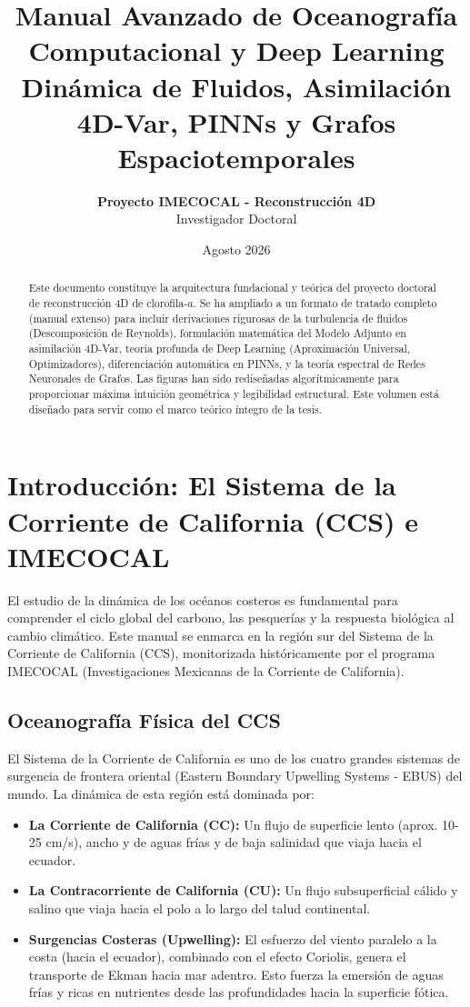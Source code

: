 \documentclass[11pt,a4paper]{article}
\title{\textbf{\Huge Manual Avanzado de Oceanografía Computacional y Deep Learning}\\ \vspace{0.8cm} \LARGE Dinámica de Fluidos, Asimilación 4D-Var, PINNs y Grafos Espaciotemporales}
\author{\textbf{Proyecto IMECOCAL - Reconstrucción 4D} \\ Investigador Doctoral}
\date{Agosto 2026}
\begin{document}
\maketitle
\thispagestyle{empty}

\vspace{2cm}
\begin{abstract}
\noindent Este documento constituye la arquitectura fundacional y teórica del proyecto doctoral de reconstrucción 4D de clorofila-$a$. Se ha ampliado a un formato de tratado completo (manual extenso) para incluir derivaciones rigurosas de la turbulencia de fluidos (Descomposición de Reynolds), formulación matemática del Modelo Adjunto en asimilación 4D-Var, teoría profunda de Deep Learning (Aproximación Universal, Optimizadores), diferenciación automática en PINNs, y la teoría espectral de Redes Neuronales de Grafos. Las figuras han sido rediseñadas algorítmicamente para proporcionar máxima intuición geométrica y legibilidad estructural. Este volumen está diseñado para servir como el marco teórico íntegro de la tesis.
\end{abstract}

\newpage
\tableofcontents
\newpage

\section{Introducción: El Sistema de la Corriente de California (CCS) e IMECOCAL}

El estudio de la dinámica de los océanos costeros es fundamental para comprender el ciclo global del carbono, las pesquerías y la respuesta biológica al cambio climático. Este manual se enmarca en la región sur del Sistema de la Corriente de California (CCS), monitorizada históricamente por el programa IMECOCAL (Investigaciones Mexicanas de la Corriente de California).

\subsection{Oceanografía Física del CCS}
El Sistema de la Corriente de California es uno de los cuatro grandes sistemas de surgencia de frontera oriental (Eastern Boundary Upwelling Systems - EBUS) del mundo. La dinámica de esta región está dominada por:
\begin{itemize}
    \item \textbf{La Corriente de California (CC):} Un flujo de superficie lento (aprox. 10-25 cm/s), ancho y de aguas frías y de baja salinidad que viaja hacia el ecuador.
    \item \textbf{La Contracorriente de California (CU):} Un flujo subsuperficial cálido y salino que viaja hacia el polo a lo largo del talud continental.
    \item \textbf{Surgencias Costeras (Upwelling):} El esfuerzo del viento paralelo a la costa (hacia el ecuador), combinado con el efecto Coriolis, genera el transporte de Ekman hacia mar adentro. Esto fuerza la emersión de aguas frías y ricas en nutrientes desde las profundidades hacia la superficie fótica.
\end{itemize}
\end{document}
